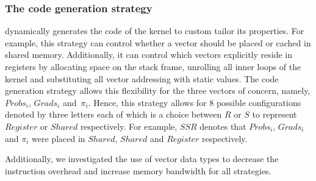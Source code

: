 \subsubsection*{The code generation strategy} dynamically generates the code of the kernel to
custom tailor its properties. For example, this strategy can control whether a
vector should be placed or cached in shared memory. Additionally, it can
control which vectors explicitly reside in registers by allocating space on the
stack frame, unrolling all inner loops of the kernel and substituting all
vector addressing with static values. The code generation strategy allows this
flexibility for the three vectors of concern, namely, $Probs_i$, $Grads_i$
and~$\pi_i$.
Hence, this strategy allows for 8 possible configurations denoted by
three letters each of which is a choice between $R$ or $S$ to represent
$Register$ or $Shared$ respectively. For example, $SSR$ denotes that $Probs_i$,
$Grads_i$ and $\pi_i$ were placed in $Shared$, $Shared$ and $Register$
respectively.

Additionally, we investigated the use of vector data types to decrease the
instruction overhead and increase memory bandwidth for all strategies.
